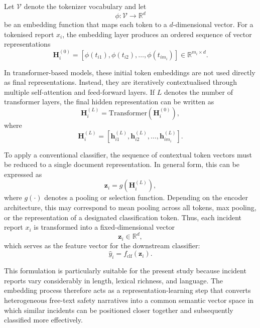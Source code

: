 \documentclass[11pt, titlepage, bibliography=totoc]{scrreprt}
\begin{document}
Let $\mathcal{V}$ denote the tokenizer vocabulary and let
\begin{equation}
\phi : \mathcal{V} \rightarrow \mathbb{R}^{d}
\end{equation}
be an embedding function that maps each token to a $d$-dimensional vector. For a tokenised report $x_i$, the embedding layer produces an ordered sequence of vector representations
\begin{equation}
\mathbf{H}_i^{(0)} =
\left[
\phi(t_{i1}), \phi(t_{i2}), \dots, \phi(t_{im_i})
\right]
\in \mathbb{R}^{m_i \times d}.
\end{equation}

In transformer-based models, these initial token embeddings are not used directly as final representations. Instead, they are iteratively contextualised through multiple self-attention and feed-forward layers. If $L$ denotes the number of transformer layers, the final hidden representation can be written as
\begin{equation}
\mathbf{H}_i^{(L)} = \mathrm{Transformer}\!\left(\mathbf{H}_i^{(0)}\right),
\end{equation}
where
\begin{equation}
\mathbf{H}_i^{(L)} =
\left[
\mathbf{h}_{i1}^{(L)},
\mathbf{h}_{i2}^{(L)},
\dots,
\mathbf{h}_{im_i}^{(L)}
\right].
\end{equation}

To apply a conventional classifier, the sequence of contextual token vectors must be reduced to a single document representation. In general form, this can be expressed as
\begin{equation}
\mathbf{z}_i = g\!\left(\mathbf{H}_i^{(L)}\right),
\end{equation}
where $g(\cdot)$ denotes a pooling or selection function. Depending on the encoder architecture, this may correspond to mean pooling across all tokens, max pooling, or the representation of a designated classification token. Thus, each incident report $x_i$ is transformed into a fixed-dimensional vector
\begin{equation}
\mathbf{z}_i \in \mathbb{R}^{d},
\end{equation}
which serves as the feature vector for the downstream classifier:
\begin{equation}
\hat{y}_i = f_{\mathrm{clf}}(\mathbf{z}_i).
\end{equation}

This formulation is particularly suitable for the present study because incident reports vary considerably in length, lexical richness, and language. The embedding process therefore acts as a representation-learning step that converts heterogeneous free-text safety narratives into a common semantic vector space in which similar incidents can be positioned closer together and subsequently classified more effectively.
\end{document}
